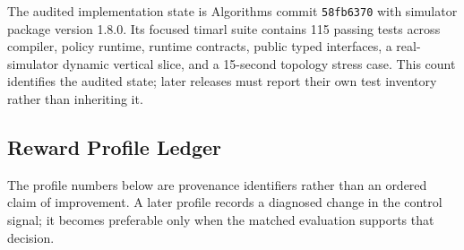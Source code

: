 The audited implementation state is Algorithms commit \texttt{58fb6370} with simulator package version 1.8.0. Its focused \gls{timarl} suite contains 115 passing tests across compiler, policy runtime, runtime contracts, public typed interfaces, a real-simulator dynamic vertical slice, and a 15-second topology stress case. This count identifies the audited state; later releases must report their own test inventory rather than inheriting it.

\subsection{Reward Profile Ledger}

The profile numbers below are provenance identifiers rather than an ordered claim of improvement. A later profile records a diagnosed change in the control signal; it becomes preferable only when the matched evaluation supports that decision.

